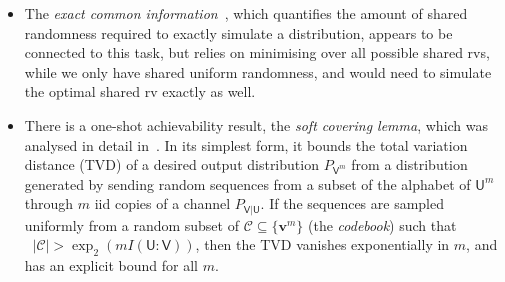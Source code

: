 \documentclass[10pt, a4paper]{article}
\numberwithin{equation}{section} %
\theoremstyle{definition}
\theoremstyle{plain}
\newcommand{\abs}[1]{\mathop{}\left\lvert#1\right\rvert}
\newcommand{\?}{\mathrel{?}} %
\newcommand{\cvec}[1]{\boldsymbol{\mathbf{#1}}}    %
\newcommand{\crv}[1]{\mathsf{#1}}
\begin{document}
    \begin{itemize}
      \item The \emph{exact common information}~\cite{ExactCommonInfo}, which quantifies the amount of shared randomness required to exactly simulate a distribution, appears to be connected to this task, but relies on minimising over all possible shared rvs, while we only have shared uniform randomness, and would need to simulate the optimal shared rv exactly as well.
      \item There is a one-shot achievability result, the \emph{soft covering lemma}, which was analysed in detail in~\cite[Lem. IV.1]{DistrChanSynth}. In its simplest form, it bounds the total variation distance (TVD) of a desired output distribution \(P_{\crv{V}^m}\) from a distribution generated by sending random sequences from a subset of the alphabet of \(\crv{U}^{m}\) through \(m\) iid copies of a channel \(P_{\crv{V}|\crv{U}}\). If the sequences are sampled uniformly from a random subset of \(\mathcal{C} \subseteq \{\cvec{v}^m\}\) (the \emph{codebook}) such that \(\abs{\mathcal{C}} > \exp_2(mI(\crv{U}:\crv{V}))\), then the TVD vanishes exponentially in \(m\), and has an explicit bound for all \(m\).


\end{itemize}
\end{document}
